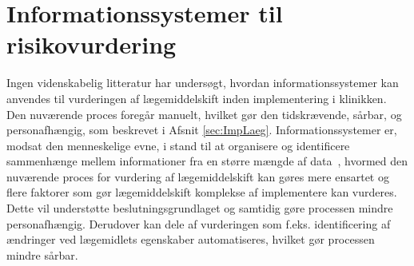 
\section{Informationssystemer til risikovurdering} \label{sec:Inform_Risk}

Ingen videnskabelig litteratur har undersøgt, hvordan informationssystemer kan anvendes til vurderingen af lægemiddelskift inden implementering i klinikken. Den nuværende proces foregår manuelt, hvilket gør den tidskrævende, sårbar, og personafhængig, som beskrevet i Afsnit \ref{sec:ImpLaeg}. Informationssystemer er, modsat den menneskelige evne, i stand til at organisere og identificere sammenhænge mellem informationer fra en større mængde af data~\citep{Agrawal2009}, hvormed den nuværende proces for vurdering af lægemiddelskift kan gøres mere ensartet og flere faktorer som gør lægemiddelskift komplekse af implementere kan vurderes. Dette vil understøtte beslutningsgrundlaget og samtidig gøre processen mindre personafhængig. Derudover kan dele af vurderingen som f.eks. identificering af ændringer ved lægemidlets egenskaber automatiseres, hvilket gør processen mindre sårbar. 

